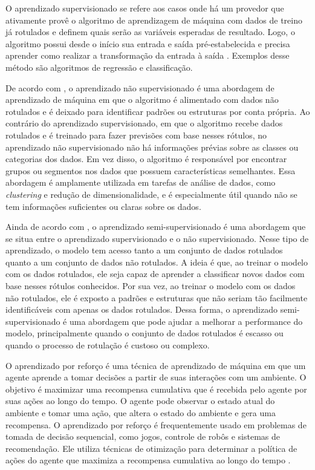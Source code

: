 O aprendizado supervisionado se refere aos casos onde há um provedor que ativamente provê o algoritmo de aprendizagem de máquina com dados de treino já rotulados e definem quais serão as variáveis esperadas de resultado. 
Logo, o algoritmo possui desde o início sua entrada e saída pré-estabelecida e precisa aprender como realizar a transformação da entrada à saída \cite{Russell2009}.
Exemplos desse método são algoritmos de regressão e classificação.

De acordo com , o aprendizado não supervisionado é uma abordagem de aprendizado de máquina em que o algoritmo é alimentado com dados não rotulados e é deixado para identificar padrões ou estruturas por conta própria. 
Ao contrário do aprendizado supervisionado, em que o algoritmo recebe dados rotulados e é treinado para fazer previsões com base nesses rótulos, no aprendizado não supervisionado não há informações prévias sobre as classes ou categorias dos dados. 
Em vez disso, o algoritmo é responsável por encontrar grupos ou segmentos nos dados que possuem características semelhantes. 
Essa abordagem é amplamente utilizada em tarefas de análise de dados, como \textit{clustering} e redução de dimensionalidade, e é especialmente útil quando não se tem informações suficientes ou claras sobre os dados.

Ainda de acordo com , o aprendizado semi-supervisionado é uma abordagem que se situa entre o aprendizado supervisionado e o não supervisionado. 
Nesse tipo de aprendizado, o modelo tem acesso tanto a um conjunto de dados rotulados quanto a um conjunto de dados não rotulados. 
A ideia é que, ao treinar o modelo com os dados rotulados, ele seja capaz de aprender a classificar novos dados com base nesses rótulos conhecidos. 
Por sua vez, ao treinar o modelo com os dados não rotulados, ele é exposto a padrões e estruturas que não seriam tão facilmente identificáveis com apenas os dados rotulados. 
Dessa forma, o aprendizado semi-supervisionado é uma abordagem que pode ajudar a melhorar a performance do modelo, principalmente quando o conjunto de dados rotulados é escasso ou quando o processo de rotulação é custoso ou complexo.

O aprendizado por reforço é uma técnica de aprendizado de máquina em que um agente aprende a tomar decisões a partir de suas interações com um ambiente. 
O objetivo é maximizar uma recompensa cumulativa que é recebida pelo agente por suas ações ao longo do tempo. 
O agente pode observar o estado atual do ambiente e tomar uma ação, que altera o estado do ambiente e gera uma recompensa. 
O aprendizado por reforço é frequentemente usado em problemas de tomada de decisão sequencial, como jogos, controle de robôs e sistemas de recomendação. 
Ele utiliza técnicas de otimização para determinar a política de ações do agente que maximiza a recompensa cumulativa ao longo do tempo \cite{geeron2017handson}.

